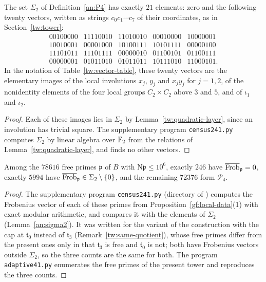 \begin{lemma}\label{an:sigma2}
The set $\Sigma_2$ of Definition~\ref{an:P4} has exactly $21$ elements: zero
and the following twenty vectors, written as strings $c_0c_1\cdots c_7$ of
their coordinates, as in Section~\ref{tw:tower}:
\[
\begin{array}{ccccc}
 00100000&11110010&11010010&00010000&10000001\\
 10010001&00001000&10100111&10101111&00000100\\
 11101011&11101111&00000010&01100101&01100111\\
 00000001&01011010&01011011&10111010&11000101.
\end{array}
\]
In the notation of Table~\ref{tw:vector-table}, these twenty vectors are the
elementary images of the local involutions $x_j$, $y_j$ and $x_jy_j$ for
$j=1,2$, of the nonidentity elements of the four local groups
$C_2\times C_2$ above $3$ and $5$, and of $\iota_1$ and $\iota_2$.
\end{lemma}

\begin{proof}
Each of these images lies in $\Sigma_2$ by Lemma~\ref{tw:quadratic-layer},
since an involution has trivial square. The supplementary program
\texttt{census241.py} computes $\Sigma_2$ by linear algebra over $\mathbb F_2$
from the relations of Lemma~\ref{tw:quadratic-layer}, and finds no other
vectors.
\end{proof}

\begin{proposition}\label{an:census-prop}
Among the $78616$ free primes
$\mathfrak p$ of $B$ with $\mathrm N\mathfrak p\le10^6$, exactly $246$ have
$\overline{\operatorname{Frob}}_{\mathfrak p}=0$, exactly $5994$ have
$\overline{\operatorname{Frob}}_{\mathfrak p}\in\Sigma_2\setminus\{0\}$, and the remaining $72376$ form
$\mathcal P_4$.
\end{proposition}

\begin{proof}
The supplementary program \texttt{census241.py} (directory
 of \cite{NaslundCode4317}) computes the
Frobenius vector of each of these primes from
Proposition~\ref{gf:local-data}(1) with exact modular arithmetic, and compares
it with the elements of $\Sigma_2$ (Lemma~\ref{an:sigma2}). It was written for
the variant of the construction with the cap at $\mathfrak t_0$ instead of
$\mathfrak t_3$ (Remark~\ref{tw:same-quotient}), whose free primes differ
from the present ones only in that $\mathfrak t_3$ is free and $\mathfrak t_0$
is not; both have Frobenius vectors outside $\Sigma_2$, so the three counts
are the same for both. The program \texttt{adaptive41.py} enumerates the free
primes of the present tower and reproduces the three counts.
\end{proof}

